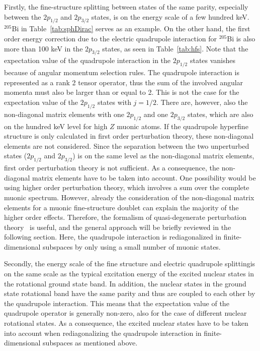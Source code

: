 Firstly, the fine-structure splitting between states of the same parity, especially between the $2p_{1/2}$ and $2p_{3/2}$ states, is on the energy scale of a few hundred keV. $^{205}$Bi in Table~\ref{tab:sphDirac} serves as an example. On the other hand, the first order energy correction due to the electric quadrupole interaction for $^{205}$Bi is also more than 100 keV in the $2p_{3/2}$ states, as seen in Table~\ref{tab:hfs}. Note that the expectation value of the quadrupole interaction in the $2p_{1/2}$ states vanishes because of angular momentum selection rules. The quadrupole interaction is represented as a rank 2 tensor operator, thus the sum of the involved angular momenta must also be larger than or equal to 2. This is not the case for the expectation value of the $2p_{1/2}$ states with $j=1/2$. There are, however, also the non-diagonal matrix elements with one $2p_{1/2}$ and one $2p_{3/2}$ states, which are also on the hundred keV level for high $Z$ muonic atoms. If the quadrupole hyperfine structure is only calculated in first order perturbation theory, these non-diagonal elements are not considered. Since the separation between the two unperturbed states ($2p_{1/2}$ and $2p_{3/2}$) is on the same level as the non-diagonal matrix elements, first order perturbation theory is not sufficient. As a consequence, the non-diagonal matrix elements have to be taken into account. One possibility would be using higher order perturbation theory, which involves a sum over the complete muonic spectrum. However, already the consideration of the non-diagonal matrix elements for a muonic fine-structure doublet can explain the majority of the higher order effects. Therefore, the formalism of quasi-degenerate perturbation theory~\cite{sakurai1994} is useful, and the general approach will be briefly reviewed in the following section. Here, the quadrupole interaction is rediagonalized in finite-dimensional subspaces by only using a small number of muonic states.

Secondly, the energy scale of the fine structure and electric quadrupole splittingis on the same scale as the typical excitation energy of the excited nuclear states in the rotational ground state band. In addition, the nuclear states in the ground state rotational band have the same parity and thus are coupled to each other by the quadrupole interaction. This means that the expectation value of the quadrupole operator is generally non-zero, also for the case of different nuclear rotational states. As a consequence, the excited nuclear states have to be taken into account when rediagonalizing the quadrupole interaction in finite-dimensional subspaces as mentioned above.

